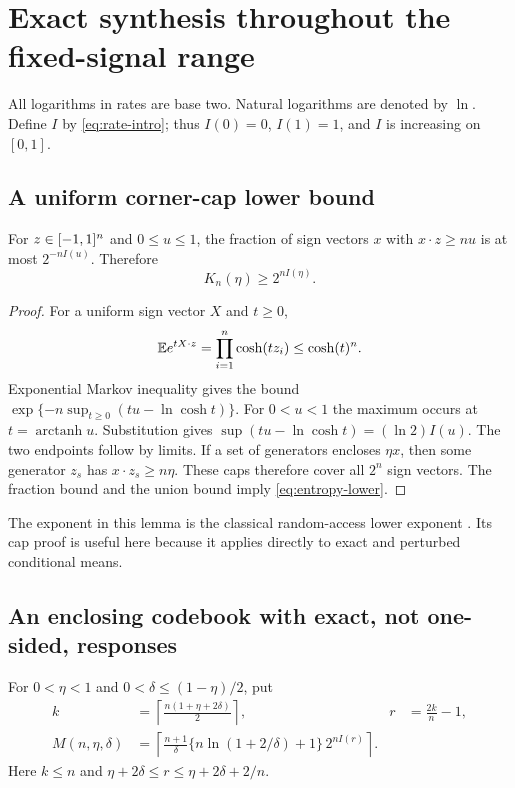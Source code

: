 \section{Exact synthesis throughout the fixed-signal range}
\label{sec:entropy}
All logarithms in rates are base two. Natural logarithms are denoted
by $\ln$. Define $I$ by \eqref{eq:rate-intro}; thus $I(0)=0$, $I(1)=1$,
and $I$ is increasing on $[0,1]$.

\subsection{A uniform corner-cap lower bound}
\begin{lemma}\label{lem:entropy-cap}
For $z\in[-1,1]^n$ and $0\le u\le1$, the fraction of sign vectors
$x$ with $x\cdot z\ge nu$ is at most $2^{-nI(u)}$. Therefore
\begin{equation}\label{eq:entropy-lower}
                         K_n(\eta)\ge2^{nI(\eta)}.
\end{equation}
\end{lemma}
\begin{proof}
For a uniform sign vector $X$ and $t\ge0$,
\[
 \mathbb E e^{tX\cdot z}=\prod_{i=1}^n\cosh(tz_i)\le\cosh(t)^n.
\]
Exponential Markov inequality gives the bound
$\exp\{-n\sup_{t\ge0}(tu-\ln\cosh t)\}$.
For $0<u<1$ the maximum occurs at $t=\operatorname{arctanh}u$.
Substitution gives $\sup(tu-\ln\cosh t)=(\ln2)I(u)$.
The two endpoints follow by limits. If a set of generators encloses
$\eta x$, then some generator $z_s$ has $x\cdot z_s\ge n\eta$.
These caps therefore cover all $2^n$ sign vectors. The fraction bound
and the union bound imply \eqref{eq:entropy-lower}.
\end{proof}
The exponent in this lemma is the classical random-access lower
exponent \cite[Theorem 2.1]{ANTVpre}. Its cap proof is useful here
because it applies directly to exact and perturbed conditional means.

\subsection{An enclosing codebook with exact, not one-sided, responses}
For $0<\eta<1$ and $0<\delta\le(1-\eta)/2$, put
\begin{align}
 k&=\left\lceil\frac{n(1+\eta+2\delta)}2\right\rceil,
 &r&=\frac{2k}n-1,\label{eq:layer-parameters}\\
 M(n,\eta,\delta)&=
 \left\lceil\frac{n+1}{\delta}
       \{n\ln(1+2/\delta)+1\}\,2^{nI(r)}\right\rceil.
                                               \label{eq:enclosure-number}
\end{align}
Here $k\le n$ and $\eta+2\delta\le r\le\eta+2\delta+2/n$.

